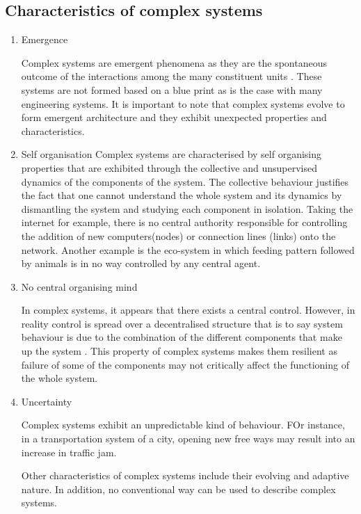 \documentclass[10pt,a4paper]{article}
\begin{document}
	
	\subsection{Characteristics of complex systems}
	\begin{enumerate}
	\item Emergence
	
	Complex systems are emergent phenomena as they are the spontaneous outcome of the interactions among the many constituent units \citep{barrat2008dynamical}. These systems are not formed based on a blue print as is the case with many engineering systems. It is important to note that complex systems evolve to form emergent architecture and they exhibit unexpected properties and characteristics.
	\item Self organisation	
	Complex systems are characterised by self organising properties that are exhibited through the collective and unsupervised dynamics of the components of the system. The collective behaviour justifies the fact that one cannot understand the whole system and its dynamics by dismantling the system and studying each component in isolation. Taking the internet for example, there is no central authority responsible for controlling the addition of new computers(nodes) or connection lines (links) onto the network. Another example is the eco-system in which feeding pattern followed by animals is in no way controlled by any central agent. 

	\item No central organising mind
	
	In complex systems, it appears that there exists a central control. However, in reality control is spread over a decentralised structure that is to say system behaviour is due to the combination of the different components that make up the system \citep{EncyBrit}. This property of complex systems makes them resilient as failure of some of the components may not critically affect the functioning of the whole system.
	
	\item Uncertainty
	
	Complex systems exhibit an unpredictable kind of behaviour. FOr instance, in a transportation system of a city, opening new free ways may result into an increase in traffic jam.
		
	Other characteristics of complex systems include their evolving and adaptive nature. In addition, no conventional way can be used to describe complex systems.
\end{enumerate}
	
\end{document}
